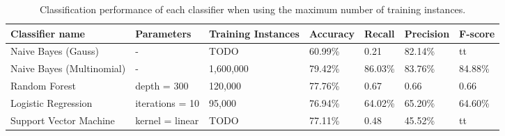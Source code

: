 \begin{table}
\centering
\caption{Classification performance of each classifier when using the maximum number of training instances.}
\begin{tabular}{ |p{3cm}||p{3cm}|p{2cm}|p{1.5cm}|p{1.5cm}|p{1.5cm}|p{1.5cm}| }
 \hline
 Classifier name &          Parameters &             Training Instances &    Accuracy &      Recall &     Precision& F-score \\
 \hline
 Naive Bayes (Gauss)        &-&            TODO&                 60.99\%&        0.21&       82.14\%& tt\\
  \hline
 Naive Bayes (Multinomial)  &-&                     1,600,000&                79.42\%&        86.03\%&       83.76\%& 84.88\%\\
  \hline
 Random Forest              &depth = 300&            120,000&                 77.76\%&        0.67&       0.66& 0.66\\
  \hline
 Logistic Regression        &iterations = 10&   95,000&    76.94\%&        64.02\%&   65.20\%& 64.60\%\\
  \hline
 Support Vector Machine     &kernel = linear&            TODO&                 77.11\%&        0.48&       45.52\%& tt\\
 \hline
\end{tabular}
\label{tab:evaluations_max}
\end{table}


